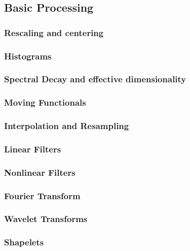 \documentclass[10pt]{article}
\begin{document}
\subsection{Basic Processing}

\subsubsection{Rescaling and centering}

\subsubsection{Histograms}

\subsubsection{Spectral Decay and effective dimensionality}

\subsubsection{Moving Functionals}

\subsubsection{Interpolation and Resampling}

\subsubsection{Linear Filters}

\subsubsection{Nonlinear Filters}

\subsubsection{Fourier Transform}

\subsubsection{Wavelet Transforms}

\subsubsection{Shapelets}
\end{document}
